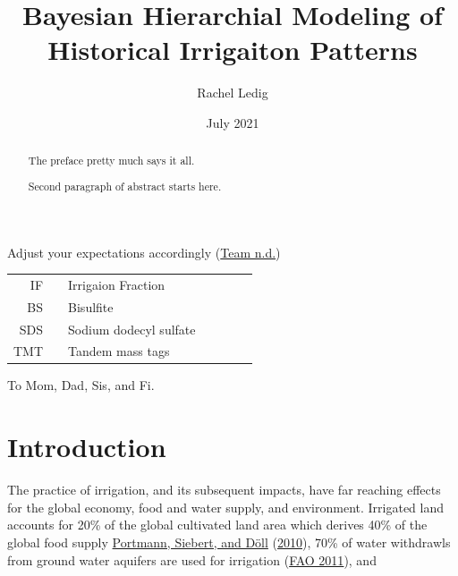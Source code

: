 \documentclass[12pt,twoside]{reedthesis}
\title{Bayesian Hierarchial Modeling of Historical Irrigaiton Patterns}
\author{Rachel Ledig}
\date{July 2021}
\begin{document}
  \maketitle

\frontmatter %
\pagestyle{empty} %
  \begin{acknowledgements}
    Adjust your expectations accordingly (\protect\hyperlink{ref-teamStanReferenceManual}{Team n.d.})
  \end{acknowledgements}

  \hypersetup{linkcolor=black}
  \setcounter{secnumdepth}{2}
  \setcounter{tocdepth}{2}
  \tableofcontents


  \listoftables

  \listoffigures
  \begin{abbreviations}
    \begin{tabular}{rp{0.2cm}lp{1cm}rp{0.2cm}l} IF & &  Irrigaion Fraction \\ BS  & &  Bisulfite \\ SDS  & &  Sodium dodecyl sulfate  \\ TMT  & & Tandem mass tags \\ \end{tabular}
  \end{abbreviations}
  \begin{abstract}
    The preface pretty much says it all.

    \par

    Second paragraph of abstract starts here.
  \end{abstract}
  \begin{dedication}
    To Mom, Dad, Sis, and Fi.
  \end{dedication}
\mainmatter %
\pagestyle{fancyplain} %

\hypertarget{intro}{%
\chapter{Introduction}\label{intro}}

The practice of irrigation, and its subsequent impacts, have far reaching effects for the global economy, food and water supply, and environment. Irrigated land accounts for 20\% of the global cultivated land area which derives 40\% of the global food supply \protect\hyperlink{ref-portmannMIRCA2000GlobalMonthly2010a}{Portmann, Siebert, and Döll} (\protect\hyperlink{ref-portmannMIRCA2000GlobalMonthly2010a}{2010}), 70\% of water withdrawls from ground water aquifers are used for irrigation (\protect\hyperlink{ref-faoStateWorldLand2011}{FAO 2011}), and
\end{document}
